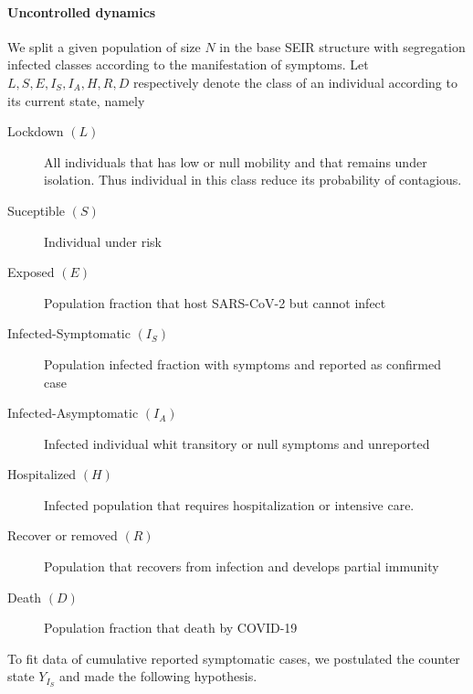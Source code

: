 \paragraph{Uncontrolled dynamics}
    We split a given population of size $N$ in the base SEIR
structure with segregation infected classes according to the manifestation
of symptoms. Let $L, S, E, I_S, I_A, H, R, D$ respectively denote the
class of an individual according to its current state, namely
%
\begin{description}
    \item[Lockdown $(L)$]
        All individuals that has low or null mobility and that remains under
        isolation. Thus individual in this class reduce its probability of
        contagious.
    \item[Suceptible $(S)$]
        Individual under risk
    \item[Exposed $(E)$]
        Population fraction that host SARS-CoV-2 but cannot infect
    \item[Infected-Symptomatic $(I_S)$]
        Population infected fraction with symptoms and reported as confirmed
        case
    \item[Infected-Asymptomatic $(I_A)$]
        Infected individual whit transitory or null symptoms and unreported
    \item[Hospitalized $(H)$]
        Infected population that requires hospitalization or intensive care.
    \item[Recover or removed $(R)$]
        Population that recovers from infection and develops partial immunity
    \item[Death $(D)$]
        Population fraction that death by COVID-19
\end{description}
%
To fit data of cumulative reported symptomatic cases, we
postulated the counter state $Y_{I_S}$ and made the following hypothesis.
%
%
